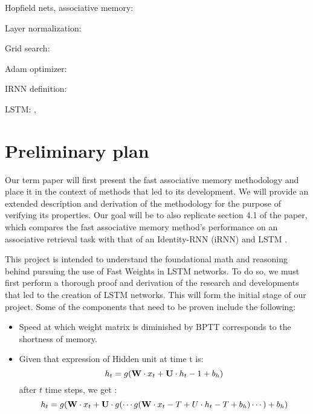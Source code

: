 Hopfield nets, associative memory: \cite{Mackay03informationtheory}

Layer normalization: \cite{1607.06450}

Grid search: \cite{Goodfellow-et-al-2016}

Adam optimizer: \cite{1412.6980}

IRNN definition: \cite{1511.03771}

LSTM: \cite{DBLP:journals/neco/GersSC00}, \cite{hochreiter1997}

\section{Preliminary plan}

Our term paper will first present the fast associative memory methodology and place it in the context of methods that led to its development. We will provide an extended description and derivation of the methodology for the purpose of verifying its properties. Our goal will be to also replicate section 4.1 of the paper, which compares the fast associative memory method's performance on an associative retrieval task with that of an Identity-RNN (iRNN) and LSTM \cite{NIPS2016_6057}.

This project is intended to understand the foundational math and reasoning behind pursuing the use of Fast Weights in LSTM networks. To do so, we must first perform a thorough proof and derivation of the research and developments that led to the creation of LSTM networks. This will form the initial stage of our project. Some of the components that need to be proven include the following:
\begin{itemize}
  \item
  Speed at which weight matrix is diminished by BPTT corresponds to the shortness of memory.
  \item
  Given that expression of Hidden unit at time t is: \\
  \begin{equation}
    h_t = g(\textbf W \cdot x_t + \textbf U \cdot h_t-1 + b_h)
  \end{equation}
  after $t$ time steps, we get : \\
  \begin{equation}
    h_t = g(\textbf W \cdot x_t + \textbf U \cdot g(\cdots g(\textbf W \cdot x_t-T + U \cdot h_t-T + b_h) \cdots) + b_h)
  \end{equation}
\end{itemize}

